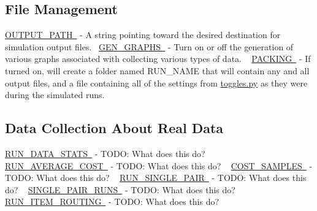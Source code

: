 \hypertarget{toggles_file}{}\subsection{File Management}\label{toggles_file}
\mbox{\hyperlink{namespacedynamicfilterapp_1_1toggles_a04644ded1d5e3fc8bd58a411209b7886}{O\+U\+T\+P\+U\+T\+\_\+\+P\+A\+TH }} -\/ A string pointing toward the desired destination for simulation output files.~\newline
 \mbox{\hyperlink{namespacedynamicfilterapp_1_1toggles_a57c1e3f291181d680f3ee118fa5c4ab8}{G\+E\+N\+\_\+\+G\+R\+A\+P\+HS }} -\/ Turn on or off the generation of various graphs associated with collecting various types of data. ~\newline
 \mbox{\hyperlink{namespacedynamicfilterapp_1_1toggles_a23735ccf05ebd9212e9ebaab8f652507}{P\+A\+C\+K\+I\+NG }} -\/ If turned on, will create a folder named R\+U\+N\+\_\+\+N\+A\+ME that will contain any and all output files, and a file containing all of the settings from \mbox{\hyperlink{toggles_8py}{toggles.\+py}} as they were during the simulated runs. ~\newline
 \hypertarget{toggles_data}{}\subsection{Data Collection About Real Data}\label{toggles_data}
\mbox{\hyperlink{namespacedynamicfilterapp_1_1toggles_a36bc09bc8fbde0df2ea1c5d9ed0cf135}{R\+U\+N\+\_\+\+D\+A\+T\+A\+\_\+\+S\+T\+A\+TS }} -\/ T\+O\+DO\+: What does this do? ~\newline
 \mbox{\hyperlink{namespacedynamicfilterapp_1_1toggles_a21f2f0f4c6df7faefb843dd318af3452}{R\+U\+N\+\_\+\+A\+V\+E\+R\+A\+G\+E\+\_\+\+C\+O\+ST }} -\/ T\+O\+DO\+: What does this do? ~\newline
 \mbox{\hyperlink{namespacedynamicfilterapp_1_1toggles_a134ac33ad7706cd6a24fda5b63c73c65}{C\+O\+S\+T\+\_\+\+S\+A\+M\+P\+L\+ES }} -\/ T\+O\+DO\+: What does this do? ~\newline
 \mbox{\hyperlink{namespacedynamicfilterapp_1_1toggles_ab61137c2de5f99b09789a6e76b7cda4c}{R\+U\+N\+\_\+\+S\+I\+N\+G\+L\+E\+\_\+\+P\+A\+IR }} -\/ T\+O\+DO\+: What does this do? ~\newline
 \mbox{\hyperlink{namespacedynamicfilterapp_1_1toggles_a70d4dc65db288020e23ca213cd97c0f8}{S\+I\+N\+G\+L\+E\+\_\+\+P\+A\+I\+R\+\_\+\+R\+U\+NS }} -\/ T\+O\+DO\+: What does this do? ~\newline
 \mbox{\hyperlink{namespacedynamicfilterapp_1_1toggles_a41d76408f27c5889dc3f40f066583a9f}{R\+U\+N\+\_\+\+I\+T\+E\+M\+\_\+\+R\+O\+U\+T\+I\+NG }} -\/ T\+O\+DO\+: What does this do? ~\newline

